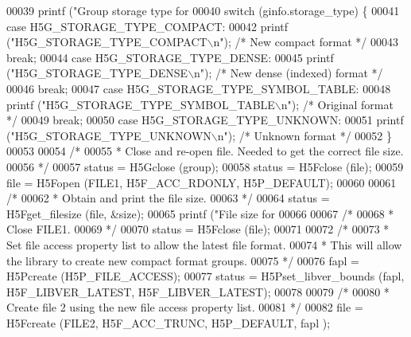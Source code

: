 \begin{DoxyCode}
00039     printf (\textcolor{stringliteral}{"Group storage type for %
00040     \textcolor{keywordflow}{switch} (ginfo.storage\_type) \{
00041         \textcolor{keywordflow}{case} H5G\_STORAGE\_TYPE\_COMPACT:
00042             printf (\textcolor{stringliteral}{"H5G\_STORAGE\_TYPE\_COMPACT\(\backslash\)n"}); \textcolor{comment}{/* New compact format */}
00043             \textcolor{keywordflow}{break};
00044         \textcolor{keywordflow}{case} H5G\_STORAGE\_TYPE\_DENSE:
00045             printf (\textcolor{stringliteral}{"H5G\_STORAGE\_TYPE\_DENSE\(\backslash\)n"}); \textcolor{comment}{/* New dense (indexed) format */}
00046             \textcolor{keywordflow}{break};
00047         \textcolor{keywordflow}{case} H5G\_STORAGE\_TYPE\_SYMBOL\_TABLE:
00048             printf (\textcolor{stringliteral}{"H5G\_STORAGE\_TYPE\_SYMBOL\_TABLE\(\backslash\)n"}); \textcolor{comment}{/* Original format */}
00049             \textcolor{keywordflow}{break};
00050         \textcolor{keywordflow}{case} H5G\_STORAGE\_TYPE\_UNKNOWN:
00051             printf (\textcolor{stringliteral}{"H5G\_STORAGE\_TYPE\_UNKNOWN\(\backslash\)n"}); \textcolor{comment}{/* Unknown format */}
00052     \}
00053 
00054     \textcolor{comment}{/*}
00055 \textcolor{comment}{     * Close and re-open file.  Needed to get the correct file size.}
00056 \textcolor{comment}{     */}
00057     status = H5Gclose (group);
00058     status = H5Fclose (file);
00059     file = H5Fopen (FILE1, H5F\_ACC\_RDONLY, H5P\_DEFAULT);
00060 
00061     \textcolor{comment}{/*}
00062 \textcolor{comment}{     * Obtain and print the file size.}
00063 \textcolor{comment}{     */}
00064     status = H5Fget\_filesize (file, &size);
00065     printf (\textcolor{stringliteral}{"File size for %
00066 
00067     \textcolor{comment}{/*}
00068 \textcolor{comment}{     * Close FILE1.}
00069 \textcolor{comment}{     */}
00070     status = H5Fclose (file);
00071 
00072     \textcolor{comment}{/*}
00073 \textcolor{comment}{     * Set file access property list to allow the latest file format.}
00074 \textcolor{comment}{     * This will allow the library to create new compact format groups.}
00075 \textcolor{comment}{     */}
00076     fapl = H5Pcreate (H5P\_FILE\_ACCESS);
00077     status = H5Pset\_libver\_bounds (fapl, H5F\_LIBVER\_LATEST, H5F\_LIBVER\_LATEST);
00078 
00079     \textcolor{comment}{/*}
00080 \textcolor{comment}{     * Create file 2 using the new file access property list.}
00081 \textcolor{comment}{     */}
00082     file = H5Fcreate (FILE2, H5F\_ACC\_TRUNC, H5P\_DEFAULT, fapl );
}}
\end{DoxyCode}

